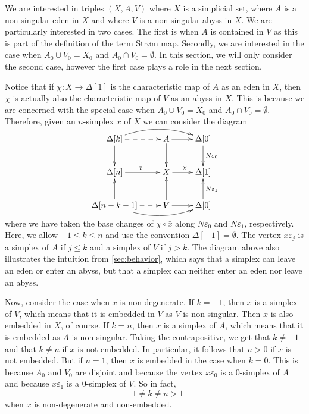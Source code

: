 We are interested in triples $(X,A,V)$ where $X$ is a simplicial set, where $A$ is a non-singular eden in $X$ and where $V$ is a non-singular abyss in $X$. We are particularly interested in two cases. The first is when $A$ is contained in $V$ as this is part of the definition of the term Str\o m map. Secondly, we are interested in the case when $A_0\cup V_0=X_0$ and $A_0\cap V_0=\emptyset$. In this section, we will only consider the second case, however the first case plays a role in the next section.

Notice that if $\chi :X\to \Delta [1]$ is the characteristic map of $A$ as an eden in $X$, then $\chi$ is actually also the characteristic map of $V$ as an abyss in $X$. This is because we are concerned with the special case when $A_0\cup V_0=X_0$ and $A_0\cap V_0=\emptyset$. Therefore, given an $n$-simplex $x$ of $X$ we can consider the diagram
\begin{equation}\label{eq:diagram_proof_of_prop_desingularizing_after_collapsing_elysium}
\begin{gathered}
\xymatrix{
\Delta [k] \ar[d] \ar@{-->}[r] \ar@/^1pc/[rr] & A \ar[d] \ar[r] & \Delta [0] \ar[d]^{N\varepsilon _0} \\
\Delta [n] \ar[r]^{\bar{x} } & X \ar[r]^\chi & \Delta [1] \\
\Delta [n-k-1] \ar[u] \ar@/_1pc/[rr] \ar@{-->}[r] & V \ar[u] \ar[r] & \Delta [0] \ar[u]_{N\varepsilon _1}
}
\end{gathered}
\end{equation}
where we have taken the base changes of $\chi \circ \bar{x}$ along $N\varepsilon _0$ and $N\varepsilon _1$, respectively. Here, we allow $-1\leq k\leq n$ and use the convention $\Delta [-1]=\emptyset$. The vertex $x\varepsilon _j$ is a simplex of $A$ if $j\leq k$ and a simplex of $V$ if $j>k$. The diagram above also illustrates the intuition from \cref{sec:behavior}, which says that a simplex can leave an eden or enter an abyss, but that a simplex can neither enter an eden nor leave an abyss.

Now, consider the case when $x$ is non-degenerate. If $k=-1$, then $x$ is a simplex of $V$, which means that it is embedded in $V$ as $V$ is non-singular. Then $x$ is also embedded in $X$, of course. If $k=n$, then $x$ is a simplex of $A$, which means that it is embedded as $A$ is non-singular. Taking the contrapositive, we get that $k\neq -1$ and that $k\neq n$ if $x$ is not embedded. In particular, it follows that $n>0$ if $x$ is not embedded. But if $n=1$, then $x$ is embedded in the case when $k=0$. This is because $A_0$ and $V_0$ are disjoint and because the vertex $x\varepsilon _0$ is a $0$-simplex of $A$ and because $x\varepsilon _1$ is a $0$-simplex of $V$. So in fact,
\begin{equation}\label{eq:conditions_proof_of_prop_desingularizing_after_collapsing_elysium}
-1\neq k\neq n>1
\end{equation}
when $x$ is non-degenerate and non-embedded.

